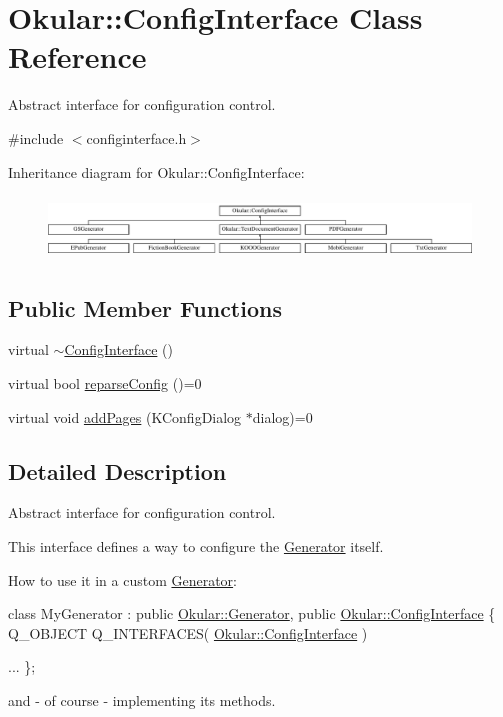 \hypertarget{classOkular_1_1ConfigInterface}{\section{Okular\+:\+:Config\+Interface Class Reference}
\label{classOkular_1_1ConfigInterface}
}


Abstract interface for configuration control.  




{\ttfamily \#include $<$configinterface.\+h$>$}

Inheritance diagram for Okular\+:\+:Config\+Interface\+:\begin{figure}[H]
\begin{center}
\leavevmode
\includegraphics[height=1.680000cm]{classOkular_1_1ConfigInterface}
\end{center}
\end{figure}
\subsection*{Public Member Functions}
\begin{DoxyCompactItemize}
\item 
virtual \hyperlink{classOkular_1_1ConfigInterface_a7aaa737cc8907ee1944e330c43b3c571}{$\sim$\+Config\+Interface} ()
\item 
virtual bool \hyperlink{classOkular_1_1ConfigInterface_a0f61ec6852e483b898efd9709b1ef63b}{reparse\+Config} ()=0
\item 
virtual void \hyperlink{classOkular_1_1ConfigInterface_a75030ba3abbbd134e388c05154695610}{add\+Pages} (K\+Config\+Dialog $\ast$dialog)=0
\end{DoxyCompactItemize}


\subsection{Detailed Description}
Abstract interface for configuration control. 

This interface defines a way to configure the \hyperlink{classOkular_1_1Generator}{Generator} itself.

How to use it in a custom \hyperlink{classOkular_1_1Generator}{Generator}\+: 
\begin{DoxyCode}
\textcolor{keyword}{class }MyGenerator : \textcolor{keyword}{public} \hyperlink{classOkular_1_1Generator}{Okular::Generator}, \textcolor{keyword}{public} 
      \hyperlink{classOkular_1_1ConfigInterface}{Okular::ConfigInterface}
\{
    Q\_OBJECT
    Q\_INTERFACES( \hyperlink{classOkular_1_1ConfigInterface}{Okular::ConfigInterface} )

    ...
\};
\end{DoxyCode}
 and -\/ of course -\/ implementing its methods. 

